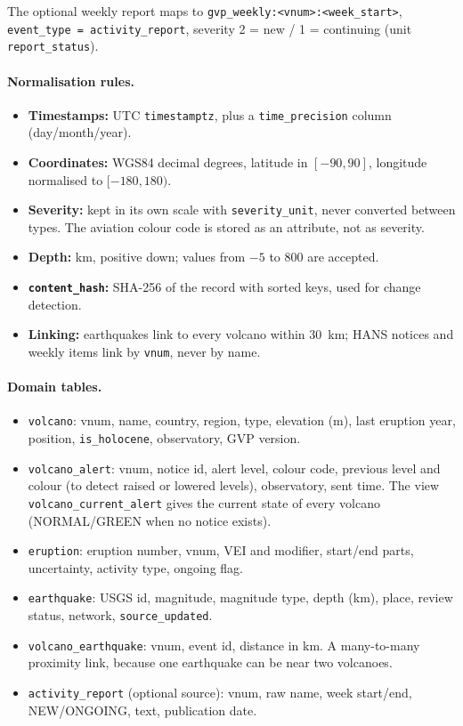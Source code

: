 \documentclass[11pt,a4paper]{article}
\begin{document}
\noindent
The optional weekly report maps to
\texttt{gvp\_weekly:<vnum>:<week\_start>}, \texttt{event\_type = activity\_report},
severity 2 = new / 1 = continuing (unit \texttt{report\_status}).

\paragraph{Normalisation rules.}
\begin{itemize}
  \item \textbf{Timestamps:} UTC \texttt{timestamptz}, plus a \texttt{time\_precision}
  column (day/month/year).
  \item \textbf{Coordinates:} WGS84 decimal degrees, latitude in $[-90, 90]$,
  longitude normalised to $[-180, 180)$.
  \item \textbf{Severity:} kept in its own scale with \texttt{severity\_unit}, never
  converted between types. The aviation colour code is stored as an attribute, not as
  severity.
  \item \textbf{Depth:} km, positive down; values from $-5$ to 800 are accepted.
  \item \textbf{\texttt{content\_hash}:} SHA-256 of the record with sorted keys, used
  for change detection.
  \item \textbf{Linking:} earthquakes link to every volcano within 30~km; HANS notices
  and weekly items link by \texttt{vnum}, never by name.
\end{itemize}

\paragraph{Domain tables.}
\begin{itemize}
  \item \texttt{volcano}: vnum, name, country, region, type, elevation (m), last
  eruption year, position, \texttt{is\_holocene}, observatory, GVP version.
  \item \texttt{volcano\_alert}: vnum, notice id, alert level, colour code, previous
  level and colour (to detect raised or lowered levels), observatory, sent time. The
  view \texttt{volcano\_current\_alert} gives the current state of every volcano
  (NORMAL/GREEN when no notice exists).
  \item \texttt{eruption}: eruption number, vnum, VEI and modifier, start/end parts,
  uncertainty, activity type, ongoing flag.
  \item \texttt{earthquake}: USGS id, magnitude, magnitude type, depth (km), place,
  review status, network, \texttt{source\_updated}.
  \item \texttt{volcano\_earthquake}: vnum, event id, distance in km. A many-to-many
  proximity link, because one earthquake can be near two volcanoes.
  \item \texttt{activity\_report} (optional source): vnum, raw name, week start/end,
  NEW/ONGOING, text, publication date.
\end{itemize}
\end{document}

